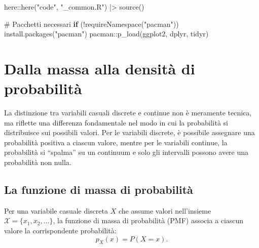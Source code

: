 \documentclass[
  letterpaper,
  DIV=11,
  numbers=noendperiod,
  oneside]{scrreprt}
\newenvironment{Shaded}{\begin{snugshade}}{\end{snugshade}}
\newcommand{\CommentTok}[1]{\textcolor[rgb]{0.37,0.37,0.37}{#1}}
\newcommand{\ControlFlowTok}[1]{\textcolor[rgb]{0.00,0.23,0.31}{\textbf{#1}}}
\newcommand{\FunctionTok}[1]{\textcolor[rgb]{0.28,0.35,0.67}{#1}}
\newcommand{\NormalTok}[1]{\textcolor[rgb]{0.00,0.23,0.31}{#1}}
\newcommand{\SpecialCharTok}[1]{\textcolor[rgb]{0.37,0.37,0.37}{#1}}
\newcommand{\StringTok}[1]{\textcolor[rgb]{0.13,0.47,0.30}{#1}}
\theoremstyle{definition}
\theoremstyle{plain}
\theoremstyle{definition}
\theoremstyle{remark}
\begin{document}
\begin{tcolorbox}[enhanced jigsaw, arc=.35mm, breakable, colbacktitle=quarto-callout-caution-color!10!white, opacityback=0, toprule=.15mm, rightrule=.15mm, colback=white, opacitybacktitle=0.6, leftrule=.75mm, coltitle=black, bottomtitle=1mm, left=2mm, toptitle=1mm, title=\textcolor{quarto-callout-caution-color}{\faFire}\hspace{0.5em}{Preparazione del Notebook}, titlerule=0mm, bottomrule=.15mm, colframe=quarto-callout-caution-color-frame]

\begin{Shaded}
\begin{Highlighting}[]
\NormalTok{here}\SpecialCharTok{::}\FunctionTok{here}\NormalTok{(}\StringTok{"code"}\NormalTok{, }\StringTok{"\_common.R"}\NormalTok{) }\SpecialCharTok{|\textgreater{}} 
  \FunctionTok{source}\NormalTok{()}

\CommentTok{\# Pacchetti necessari}
\ControlFlowTok{if}\NormalTok{ (}\SpecialCharTok{!}\FunctionTok{requireNamespace}\NormalTok{(}\StringTok{"pacman"}\NormalTok{)) }\FunctionTok{install.packages}\NormalTok{(}\StringTok{"pacman"}\NormalTok{)}
\NormalTok{pacman}\SpecialCharTok{::}\FunctionTok{p\_load}\NormalTok{(ggplot2, dplyr, tidyr)}
\end{Highlighting}
\end{Shaded}

\end{tcolorbox}

\section{Dalla massa alla densità di
probabilità}\label{dalla-massa-alla-densituxe0-di-probabilituxe0}

La distinzione tra variabili casuali discrete e continue non è meramente
tecnica, ma riflette una differenza fondamentale nel modo in cui la
probabilità si distribuisce sui possibili valori. Per le variabili
discrete, è possibile assegnare una probabilità positiva a ciascun
valore, mentre per le variabili continue, la probabilità si ``spalma''
su un continuum e solo gli intervalli possono avere una probabilità non
nulla.

\subsection{La funzione di massa di
probabilità}\label{la-funzione-di-massa-di-probabilituxe0}

Per una variabile casuale discreta \(X\) che assume valori nell'insieme
\(\mathcal{X} = \{x_1, x_2, \ldots\}\), la funzione di massa di
probabilità (PMF) associa a ciascun valore la corrispondente
probabilità: \[
p_X(x) = P(X = x).
\]
\end{document}
